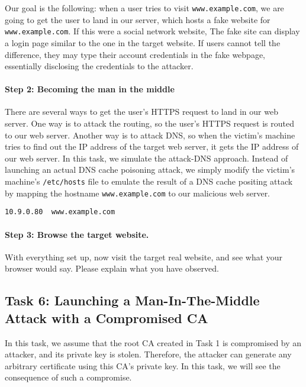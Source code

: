 Our goal is the following: when a user tries to visit \texttt{www.example.com}, 
we are going to get the user to land in our server, which hosts 
a fake website for \texttt{www.example.com}. If this were a social network
website, The fake site can display a login page similar to the
one in the target website. If users cannot tell the difference, they may type their account credentials
in the fake webpage, essentially disclosing the credentials to the attacker. 


\paragraph{Step 2: Becoming the man in the middle} 
There are several ways to get the user's HTTPS request to land in our web server. One way is to
attack the routing, so the user's HTTPS request is routed to our web server. Another way is
to attack DNS, so when the victim's machine tries to find out the IP address of the target
web server, it gets the IP address of our web server. In this task, we simulate
the attack-DNS approach. Instead of
launching an actual DNS cache poisoning attack, we simply modify the victim's machine's 
\texttt{/etc/hosts} file to emulate the result of a DNS cache positing attack by 
mapping the hostname \texttt{www.example.com} to our malicious web server.


\begin{lstlisting}
10.9.0.80  www.example.com
\end{lstlisting}


\paragraph{Step 3: Browse the target website.}
With everything set up, now visit the target real website, and 
see what your browser would say. Please explain what you have observed. 




\subsection{Task 6: Launching a Man-In-The-Middle Attack with a Compromised CA}

In this task, we assume that the root CA created in Task 1 is compromised by an attacker, 
and its private key is stolen. Therefore, the attacker can generate any arbitrary certificate 
using this CA's private key. In this task, we will see 
the consequence of such a compromise. 


